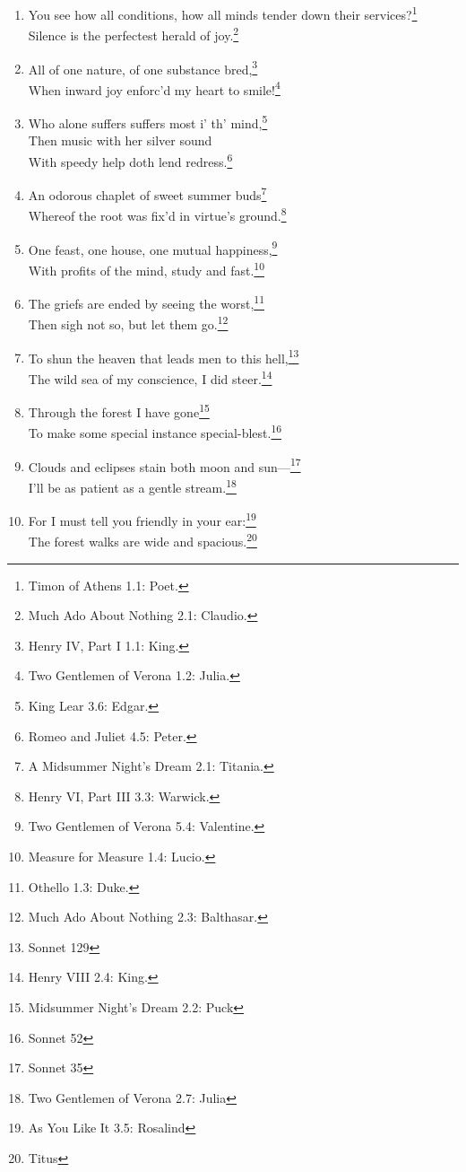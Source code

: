 \documentclass[17pt,twoside]{extarticle}
\begin{document}
\begin{enumerate}
  love.\footnote{Henry V 5.2: Queen Isabella}
\item
  You see how all conditions, how all minds tender down their
  services?\footnote{Timon of Athens 1.1: Poet.}\\Silence is the
  perfectest herald of joy.\footnote{Much Ado About Nothing 2.1:
    Claudio.}
\item
  All of one nature, of one substance bred,\footnote{Henry IV, Part I
    1.1: King.}\\When inward joy enforc'd my heart to smile!\footnote{Two
    Gentlemen of Verona 1.2: Julia.}
\item
  Who alone suffers suffers most i' th' mind,\footnote{King Lear 3.6:
    Edgar.}\\Then music with her silver sound\\With speedy help doth
  lend redress.\footnote{Romeo and Juliet 4.5: Peter.}
\item
  An odorous chaplet of sweet summer buds\footnote{A Midsummer Night's
    Dream 2.1: Titania.}\\Whereof the root was fix'd in virtue's
  ground.\footnote{Henry VI, Part III 3.3: Warwick.}
\item
  One feast, one house, one mutual happiness,\footnote{Two Gentlemen of
    Verona 5.4: Valentine.}\\With profits of the mind, study and
  fast.\footnote{Measure for Measure 1.4: Lucio.}
\item
  The griefs are ended by seeing the worst,\footnote{Othello 1.3: Duke.}\\Then
  sigh not so, but let them go.\footnote{Much Ado About Nothing 2.3:
    Balthasar.}
\item
  To shun the heaven that leads men to this hell,\footnote{Sonnet 129}\\The
  wild sea of my conscience, I did steer.\footnote{Henry VIII 2.4: King.}
\item
  Through the forest I have gone\footnote{Midsummer Night's Dream 2.2:
    Puck}\\To make some special instance special-blest.\footnote{Sonnet
    52}
\item
  Clouds and eclipses stain both moon and sun---\footnote{Sonnet 35}\\I'll
  be as patient as a gentle stream.\footnote{Two Gentlemen of Verona
    2.7: Julia}
\item
  For I must tell you friendly in your ear:\footnote{As You Like It 3.5:
    Rosalind}\\The forest walks are wide and spacious.\footnote{Titus
}
\end{enumerate}
\end{document}
